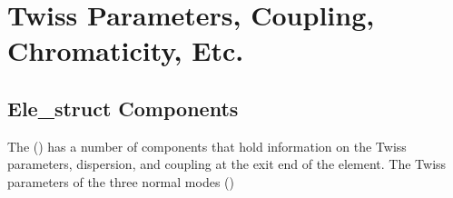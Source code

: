 \chapter{Twiss Parameters, Coupling, Chromaticity, Etc.}
\label{c:twiss}

\section{Ele\_struct Components}
\label{s:twiss.ele}


The  () has a number of components that
hold information on the Twiss parameters, dispersion, and coupling
at the exit end of the element. The Twiss parameters of the three 
normal modes ()

